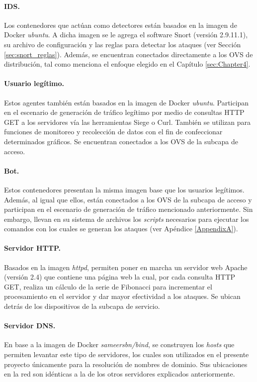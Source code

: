 \paragraph{IDS.} Los contenedores que actúan como detectores están basados en la
imagen de Docker \textit{ubuntu}. A dicha imagen se le agrega el software
Snort (versión 2.9.11.1), su archivo de configuración y las reglas para detectar
los ataques (ver Sección \ref{sec:snort_reglas}). Además, se encuentran
conectados directamente a los OVS de distribución, tal como menciona el enfoque
elegido en el Capítulo \ref{sec:Chapter4}.

\paragraph{Usuario legítimo.} Estos agentes también están basados en la imagen
de Docker \textit{ubuntu}. Participan en el escenario de generación de tráfico
legítimo por medio de consultas HTTP GET a los servidores vía las herramientas
Siege o Curl. También se utilizan para funciones de monitoreo y recolección de
datos con el fin de confeccionar determinados gráficos. Se encuentran conectados
a los OVS de la subcapa de acceso.

\paragraph{Bot.} Estos contenedores presentan la misma imagen base que
los usuarios legítimos. Además, al igual que ellos, están conectados a los OVS de la subcapa de acceso y participan en el escenario de generación de tráfico mencionado anteriormente. Sin
embargo, llevan en su sistema de archivos los \textit{scripts} necesarios para ejecutar
los comandos con los cuales se generan los ataques (ver Apéndice
\ref{AppendixA}).


\paragraph{Servidor HTTP.} Basados en la imagen \textit{httpd}, permiten poner
en marcha un servidor web Apache (versión 2.4) que contiene una página web la
cual, por cada consulta HTTP GET, realiza un cálculo de la serie de Fibonacci para incrementar el procesamiento en el servidor y dar mayor efectividad a los ataques. Se ubican detrás de los dispositivos de la subcapa de servicio.

\paragraph{Servidor DNS.} En base a la imagen de Docker \textit{sameersbn/bind}, se construyen los \textit{hosts} que permiten levantar este tipo de servidores, los cuales son utilizados en el presente proyecto únicamente para la resolución de nombres de dominio. Sus ubicaciones en la red son idénticas a la de los otros servidores explicados anteriormente.

